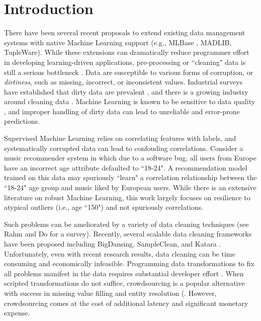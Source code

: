 \section{Introduction}
There have been several recent proposals to extend existing data management systems with native Machine Learning support (e.g., MLBase \cite{kraska2013mlbase}, MADLIB\cite{hellerstein2012madlib}, TupleWare\cite{crotty2014tupleware}).
While these extensions can dramatically reduce programmer effort in developing learning-driven applications, pre-processing or ``cleaning" data is still a serious bottleneck \cite{kandel2012}. 
Data are susceptible to various forms of corruption, or \emph{dirtiness}, such as missing, incorrect, or inconsistent values.
Industrial surveys have established that dirty data are prevalent \cite{Gartner}, and there is a growing industry around cleaning data \cite{fortunearticle}.
Machine Learning is known to be sensitive to data quality \cite{xiaofeature}, and improper handling of dirty data can lead to unreliable and error-prone predictions.

Supervised Machine Learning relies on correlating features with labels, and systematically corrupted data can lead to confouding correlations.
Consider a music recommender system in which due to a software bug, all users from Europe have an incorrect age attribute defaulted to ``18-24".
A recommendation model trained on this data may spuriously ``learn" a correlation relationship between the ``18-24" age group and music liked by European users.
While there is an extensive literature on robust Machine Learning, this work largely focuses on resilience to atypical outliers (i.e., age ``150") and not spuriously correlations.

Such problems can be ameliorated by a variety of data cleaning techniques (see Rahm and Do \cite{rahm2000data} for a survey).
Recently, several scalable data cleaning frameworks have been proposed including BigDansing\cite{khayyat2015bigdansing}, SampleClean\cite{sampleclean}, and Katara \cite{chu2015katara}. 
Unfortunately, even with recent research results, data cleaning can be time consuming and economically infeasible\cite{wang1999sample}.
Programming data transformations to fix all problems manifest in the data requires substantial developer effort \cite{kandel2012}.
When scripted transformations do not suffice, crowdsourcing is a popular alternative with success in missing value filling and entity resolution (\cite{gokhale2014corleone, park2014crowdfill, sampleclean,chu2015katara}.
However, crowdsourcing comes at the cost of additional latency and significant monetary expense.

